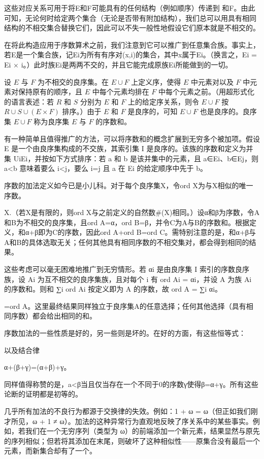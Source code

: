 \documentclass[12pt,a4paper]{ctexbook}
\theoremstyle{definition}
\theoremstyle{remark}
\begin{document}
{这些对应关系可用于将E和F可能具有的任何结构（例如顺序）传递到 和F。由此可知，无论何时给定两个集合（无论是否带有附加结构），我们总可以用具有相同结构的不相交集合替换它们，因此可以不失一般性地假设它们原本就是不相交的。

在将此构造应用于序数算术之前，我们注意到它可以推广到任意集合族。事实上，若{E}是一个集合族，记Ei为所有有序对(x,i)的集合，其中x属于Ei。（换言之，Ei = Ei × {i}。）此时族{Ei}是两两不交的，并且它能完成原族{Ei}所能做到的一切。

设 \(E\) 与 \(F\) 为不相交的良序集。在 \(E \cup F\) 上定义序，使得 \(E\) 中元素对以及 \(F\) 中元素对保持原有的顺序，且 \(E\) 中每个元素均排在 \(F\) 中每个元素之前。（用超形式化的语言表述：若 \(R\) 和 \(S\) 分别为 \(E\) 和 \(F\) 上的给定序关系，则令 \(E \cup F\) 按 \(R \cup S \cup (E \times F)\) 排序。）由于 \(E\) 和 \(F\) 是良序的，可知 \(E \cup F\) 也是良序的。良序集 \(E \cup F\) 称为良序集 \(E\) 与 \(F\) 的序数和。

有一种简单且值得推广的方法，可以将序数和的概念扩展到无穷多个被加项。假设 {E} 是一个由良序集构成的不交族，其索引集 I 是良序的。该族的序数和定义为并集 UiEi，并按如下方式排序：若 a 和 b 是该并集中的元素，且 a∈Ei、b∈Ej，则 a<b 意味着要么 i<j，要么 i=j 且 a 在 Ei 的给定顺序中先于 b。

序数的加法定义如今已是小儿科。对于每个良序集X，令ord X为与X相似的唯一序数。

X.（若X是有限的，则ord X与之前定义的自然数\#(X)相同。）设α和β为序数，令A和B为不相交的良序集，且ord A=α，ord B=β，并令C为A与B的序数和。根据定义，和α+β即为C的序数，因此ord A+ord B=ord C。需特别注意的是，和α+β与A和B的具体选取无关；任何其他具有相同序数的不相交集对，都会得到相同的结果。

这些考虑可以毫无困难地推广到无穷情形。若 {αi} 是由良序集 I 索引的序数良序族，设 {Ai} 为互不相交的良序集族，且对每个 i 有 ord Ai = αi，并设 A 为族 {Ai} 的序数和。则和 ∑i ord Ai 按定义即为 A 的序数，故 ord A = ∑i αi。

=ord A。这里最终结果同样独立于良序集A的任意选择；任何其他选择（具有相同序数）都会给出相同的和。

序数加法的一些性质是好的，另一些则是坏的。在好的方面，有这些恒等式：

以及结合律

α+(β+γ)=(α+β)+γ。

同样值得称赞的是，a<β当且仅当存在一个不同于0的序数γ使得β=α+γ。所有这些论断的证明都是初等的。

几乎所有加法的不良行为都源于交换律的失效。例如：1 + ω = ω（但正如我们刚才所见，ω + 1 ≠ ω）。加法的这种异常行为直观地反映了序关系中的某些事实。例如，若我们在一个无穷序列（类型为 ω）的前端添加一个新元素，结果显然与原先的序列相似；但若将其添加在末尾，则破坏了这种相似性——原集合没有最后一个元素，而新集合却有了一个。

}
\end{document}
